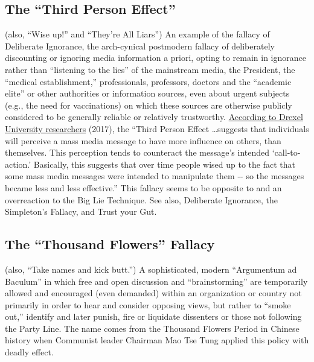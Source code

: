 \documentclass[10pt,a4paper,british]{article}
\begin{document}
\begin{multicols}{2}
	\subsection{The ``Third Person Effect'' } (also, ``Wise up!'' and ``They're All Liars'')  An example of the fallacy of Deliberate Ignorance, the arch{-}cynical postmodern fallacy of deliberately discounting or ignoring media information a priori, opting to remain in ignorance rather than ``listening to the lies'' of the mainstream media, the President, the ``medical establishment,'' professionals, professors, doctors and the ``academic elite'' or other authorities or information sources, even about urgent subjects (e.g., the need for vaccinations) on which these sources are otherwise publicly considered to be generally reliable or relatively trustworthy.  \href{https://www.eurekalert.org/pub_releases/2017-02/du-na020817.php}{According to Drexel University researchers} (2017), the ``Third Person Effect \ldots  suggests that individuals will perceive a mass media message to have more influence on others, than themselves. This perception tends to counteract the message's intended `call{-}to{-}action.' Basically, this suggests that over time people wised up to the fact that some mass media messages were intended to manipulate them {-}{-} so the messages became less and less effective.'' This fallacy seems to be opposite to and an overreaction to the Big Lie Technique. See also, Deliberate Ignorance, the Simpleton's Fallacy, and Trust your Gut.  

	\subsection{The ``Thousand Flowers'' Fallacy} (also, ``Take names and kick butt.'') A sophisticated, modern ``Argumentum ad Baculum'' in which free and open discussion and ``brainstorming'' are temporarily allowed and encouraged (even demanded) within an organization or country not primarily in order to hear and consider opposing views, but rather to ``smoke out,'' identify and later punish, fire or liquidate dissenters or those not following the Party Line. The name comes from the Thousand Flowers Period in Chinese history when Communist leader Chairman Mao Tse Tung applied this policy with deadly effect.  


\end{multicols}
\end{document}
